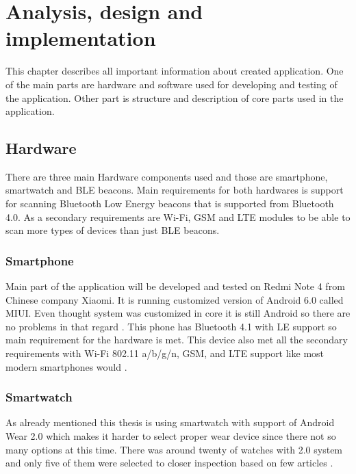 \chapter{Analysis, design and implementation}\label{sec:AnalysisDesignAndImplementation}
This chapter describes all important information about created application. One of the main parts are hardware and software used for developing and testing of the application. Other part is structure and description of core parts used in the application. 

\section{Hardware}\label{sec:Hardware}
There are three main Hardware components used and those are smartphone, smartwatch and BLE beacons. Main requirements for both hardwares is support for scanning Bluetooth Low Energy beacons that is supported from Bluetooth 4.0. As a secondary requirements are Wi-Fi, GSM and LTE modules to be able to scan more types of devices than just BLE beacons.  

\subsection{Smartphone}\label{subsec:Smartphone}
Main part of the application will be developed and tested on Redmi Note 4 from Chinese company Xiaomi. It is running customized version of Android 6.0 called MIUI. Even thought system was customized in core it is still Android so there are no problems in that regard  \cite{XRN4LTE}. This phone has Bluetooth 4.1 with LE support so main requirement for the hardware is met. This device also met all the secondary requirements with Wi-Fi 802.11 a/b/g/n, GSM, and LTE support like most modern smartphones would \cite{XRN4FPS}.

\subsection{Smartwatch}\label{subsec:Smartwatch}
As already mentioned this thesis is using smartwatch with support of Android Wear 2.0 which makes it harder to select proper wear device since there not so many options at this time. There was around twenty of watches with 2.0 system and only five of them were selected to closer inspection based on few articles \cite{BAWW, BAWW18, BAWW17}.

